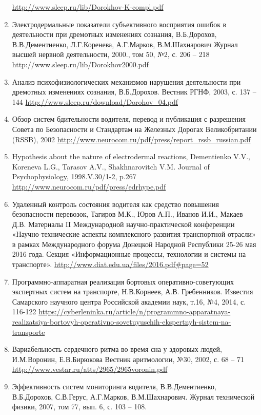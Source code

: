 \begin{enumerate}
    \url{http://www.sleep.ru/lib/Dorokhov-K-compl.pdf}
    \item Электродермальные показатели субъективного восприятия ошибок в деятельности при дремотных изменениях сознания, В.Б.Дорохов, В.В.Дементиенко, Л.Г.Коренева, А.Г.Марков, В.М.Шахнарович
    Журнал высшей нервной деятельности, 2000., том 50, №2, с. 206 – 218
    http://www.sleep.ru/lib/Dorokhov2000.pdf 
    \item Анализ психофизиологических механизмов нарушения деятельности при дремотных изменениях сознания, В.Б.Дорохов. Вестник РГНФ, 2003, с. 137 – 144
    \url{http://www.sleep.ru/download/Dorohov_04.pdf}
    \item Обзор систем бдительности водителя, перевод и публикация с разрешения Совета по Безопасности и Стандартам на Железных Дорогах Великобритании (RSSB), 2002
    \url{http://www.neurocom.ru/pdf/press/report_rssb_russian.pdf}
    \item Hypothesis about the nature of electrodermal reactions, Dementienko V.V., Koreneva L.G., Tarasov A.V., Shakhnarovitch V.M. Journal of Psychophysiology, 1998.V.30/1-2, p.267
    \url{http://www.neurocom.ru/pdf/press/edrhype.pdf}
    \item Удаленный контроль состояния водителя как средство повышения безопасности перевозок, Тагиров М.К., Юров А.П., Иванов И.И., Макаев Д.В. Материалы II Международной научно-практической конференции «Научно-технические аспекты комплексного развития транспортной отрасли» в рамках Международного форума Донецкой Народной Республики 25-26 мая 2016 года. Секция «Информационные процессы, технологии и системы на транспорте».
    \url{http://www.diat.edu.ua/files/2016.pdf#page=52}
    \item Программно-аппаратная реализация бортовых оперативно-советующих экспертных систем на транспорте, Н.В.Корнеев, А.В. Гребенников. Известия Самарского научного центра Российской академии наук, т.16, №4, 2014, с. 116-122
    \url{https://cyberleninka.ru/article/n/programmno-apparatnaya-realizatsiya-bortovyh-operativno-sovetuyuschih-ekspertnyh-sistem-na-transporte}
    \item Вариабельность сердечного ритма во время сна у здоровых людей, И.М.Воронин, Е.В.Бирюкова
    Вестник аритмологии, №30, 2002, с. 68 – 71
    \url{http://www.vestar.ru/atts/2965/2965voronin.pdf}
    \item Эффективность систем мониторинга водителя, В.В.Дементиенко, В.Б.Дорохов, С.В.Герус, А.Г.Марков, В.М.Шахнарович. Журнал технической физики, 2007, том 77, вып. 6, с. 103 – 108.

\end{enumerate}
